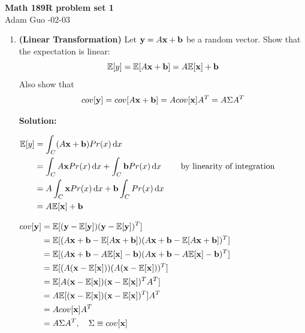\documentclass[letter,11pt]{article}
\newenvironment{solution}{
    \vspace{0.16in} {\bf Solution:}
    
}{
	\vspace{0.16in}
}
\newcommand{\inti}[4]{
	\int_{#1}^{#2} #3 \, \mathrm{d} #4
}
\newcommand{\expected}[1]{
    \mathbb{E}[#1]
}
\begin{document}
\begin{center}
    {\bf \Large Math 189R problem set 1} \\
    \vspace{0.1in}
    Adam Guo -02-03
\end{center}

\begin{enumerate}
    \item {\bf (Linear Transformation)} Let ${\bf y} = A{\bf x} + {\bf b}$ be a random vector. Show that the expectation is linear: \[\mathbb{E}[y] = \mathbb{E}[A {\bf x} + {\bf b}] = A\mathbb{E}[{\bf x}] + {\bf b}\] Also show that \[cov[{\bf y}] = cov[A{\bf x} + {\bf b}] = A cov[{\bf x}] A^T = A \Sigma A^T\]

    \begin{solution}
        $\begin{aligned}
            \mathbb{E}[y] &= \inti{C}{}{(A{\bf x} + {\bf b}) Pr(x)}{x} \\
                &= \inti{C}{}{A{\bf x} Pr(x)}{x} + \inti{C}{}{{\bf b} Pr(x)}{x} & \quad \text{by linearity of integration} \\
                &= A \inti{C}{}{{\bf x} Pr(x)}{x} + {\bf b} \inti{C}{}{Pr(x)}{x} \\
                &= A \mathbb{E}[{\bf x}] + {\bf b}
        \end{aligned}$

        \vspace{0.16in}

        $\begin{aligned}
            cov[{\bf y}] &= \mathbb{E}[({\bf y} - \mathbb{E}[{\bf y}])({\bf y} - \mathbb{E}[{\bf y}])^T] \\
                &= \mathbb{E}[(A{\bf x} + {\bf b} - \mathbb{E}[A{\bf x} + {\bf b}])(A{\bf x} + {\bf b} - \mathbb{E}[A{\bf x} + {\bf b}])^T] \\
                &= \mathbb{E}[(A{\bf x} + {\bf b} - A\mathbb{E}[{\bf x}] - {\bf b})(A{\bf x} + {\bf b} - A\mathbb{E}[{\bf x}] - {\bf b})^T] \\
                &= \mathbb{E}[(A({\bf x} - \mathbb{E}[{\bf x}]))(A({\bf x} - \mathbb{E}[{\bf x}]))^T] \\
                &= \expected{A({\bf x} - \expected{{\bf x}})({\bf x} - \expected{{\bf x}})^T A^T} \\
                &= A \expected{({\bf x} - \expected{{\bf x}})({\bf x} - \expected{{\bf x}})^T} A^T \\
                &= A cov[\textbf{x}] A^T \\
                &= A \Sigma A^T, \quad \Sigma \equiv cov[\textbf{x}]
        \end{aligned}$
    \end{solution}


\end{enumerate}
\end{document}
